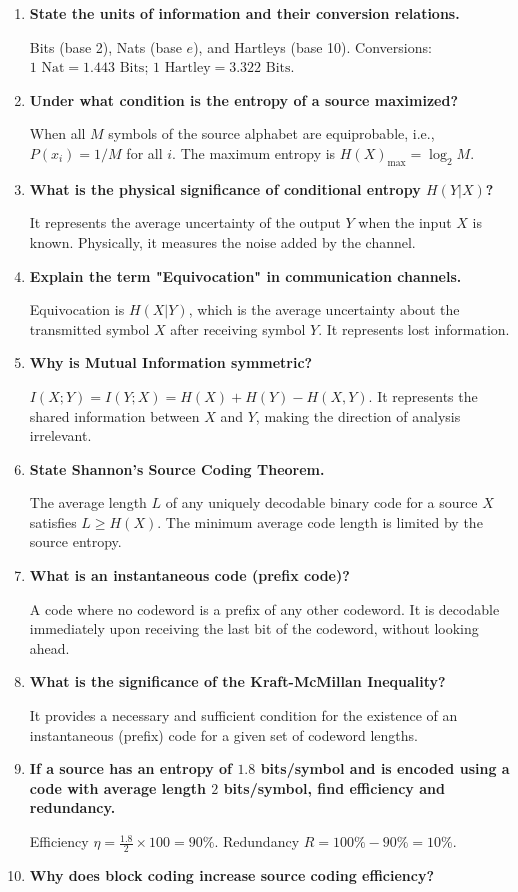 \documentclass[12pt,a4paper]{article}
\newcommand{\Q}[1]{\textbf{#1}\par\noindent\ignorespaces}
\begin{document}
\begin{tcolorbox}[exambox, title={\textbf{Frequently Asked / Viva Questions}}]
\begin{enumerate}[topsep=0pt, label=\textbf{Q\arabic*.}, itemsep=5pt]
  \item \Q{State the units of information and their conversion relations.}
    Bits (base 2), Nats (base $e$), and Hartleys (base 10). Conversions: $1 \text{ Nat} = 1.443 \text{ Bits}$; $1 \text{ Hartley} = 3.322 \text{ Bits}$.
  \item \Q{Under what condition is the entropy of a source maximized?}
    When all $M$ symbols of the source alphabet are equiprobable, i.e., $P(x_i) = 1/M$ for all $i$. The maximum entropy is $H(X)_{\text{max}} = \log_2 M$.
  \item \Q{What is the physical significance of conditional entropy $H(Y|X)$?}
    It represents the average uncertainty of the output $Y$ when the input $X$ is known. Physically, it measures the noise added by the channel.
  \item \Q{Explain the term "Equivocation" in communication channels.}
    Equivocation is $H(X|Y)$, which is the average uncertainty about the transmitted symbol $X$ after receiving symbol $Y$. It represents lost information.
  \item \Q{Why is Mutual Information symmetric?}
    $I(X; Y) = I(Y; X) = H(X) + H(Y) - H(X,Y)$. It represents the shared information between $X$ and $Y$, making the direction of analysis irrelevant.
  \item \Q{State Shannon's Source Coding Theorem.}
    The average length $L$ of any uniquely decodable binary code for a source $X$ satisfies $L \ge H(X)$. The minimum average code length is limited by the source entropy.
  \item \Q{What is an instantaneous code (prefix code)?}
    A code where no codeword is a prefix of any other codeword. It is decodable immediately upon receiving the last bit of the codeword, without looking ahead.
  \item \Q{What is the significance of the Kraft-McMillan Inequality?}
    It provides a necessary and sufficient condition for the existence of an instantaneous (prefix) code for a given set of codeword lengths.
  \item \Q{If a source has an entropy of $1.8$ bits/symbol and is encoded using a code with average length $2$ bits/symbol, find efficiency and redundancy.}
    Efficiency $\eta = \frac{1.8}{2} \times 100 = 90\%$. Redundancy $R = 100\% - 90\% = 10\%$.
  \item \Q{Why does block coding increase source coding efficiency?}

\end{enumerate}
\end{tcolorbox}
\end{document}
